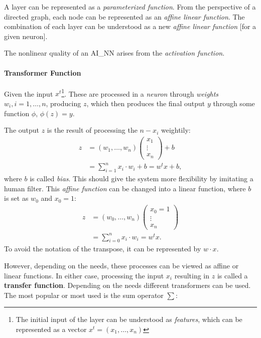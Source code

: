 A layer can be represented as a \textit{parameterized function}. From the perspective of a directed graph, each node can be represented as an \textit{affine linear function}. The combination of each layer can be understood as a new \textit{affine linear function} [for a given neuron].

The nonlinear quality of an \gls{AI_NN} arises from the \textit{activation function}.

\paragraph{Transformer Function} Given the input $x^t$\footnote{
	The initial input of the layer can be understood as \textit{features}, which can be represented as a vector  $x^t = (x_1, \dots, x_n)$
}. These are processed in a \textit{neuron} through \textit{weights} $w_i, i=1,\dots, n$, producing $z$, which then produces the final output $y$ through some function $\phi$, $\phi(z) = y$.

The output $z$ is the result of processing the $n-x_i$ weightily:
\begin{align}
z &= (w_1, \dots, w_n) \left(\begin{matrix}
		x_1 \\
		\vdots \\
		x_n
	\end{matrix} \right) + b \\
  &= \sum_{i=1}^n x_i\cdot w_i +b = w^t x + b,
\end{align}
where $b$ is called \textit{bias}. This should give the system more flexibility by imitating a human filter. This \textit{affine function} can be changed into a linear function, where $b$ is set as $w_0$ and $x_0 = 1$:
\begin{align}
z &= (w_0, \dots, w_n) \left(\begin{matrix}
		x_0 = 1 \\
		\vdots \\
		x_n
	\end{matrix} \right) \\
  &= \sum_{i=0}^n x_i\cdot w_i = w^t x.
\end{align}
To avoid the notation of the transpose, it can be represented by $w\cdot x$.

However, depending on the needs, these processes can be viewed as affine or linear functions. In either case, processing the input $x_i$ resulting in $z$ is called a \textbf{transfer function}. Depending on the needs different transformers can be used. The most popular or most used is the sum operator $\sum$:

